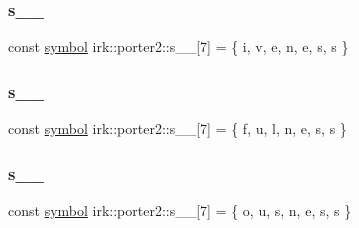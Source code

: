 \mbox{\label{namespaceirk_1_1porter2_a31f6186ad33070b805879b55bb461640}} 
\subsubsection{\texorpdfstring{s\+\_\+\_}{s\_5\_21}}
{\footnotesize\ttfamily const \mbox{\hyperlink{namespaceirk_1_1porter2_afd04c4eb58a1dabcf8f3ab2d7e9f9ed5}{symbol}} irk\+::porter2\+::s\+\_\+\_\mbox{[}7\mbox{]} = \{ \textquotesingle{}i\textquotesingle{}, \textquotesingle{}v\textquotesingle{}, \textquotesingle{}e\textquotesingle{}, \textquotesingle{}n\textquotesingle{}, \textquotesingle{}e\textquotesingle{}, \textquotesingle{}s\textquotesingle{}, \textquotesingle{}s\textquotesingle{} \}\hspace{0.3cm}{\ttfamily [static]}}

\mbox{\label{namespaceirk_1_1porter2_ad6c9dfb1faea8118a0c3d66be049c746}} 
\subsubsection{\texorpdfstring{s\+\_\+\_}{s\_5\_22}}
{\footnotesize\ttfamily const \mbox{\hyperlink{namespaceirk_1_1porter2_afd04c4eb58a1dabcf8f3ab2d7e9f9ed5}{symbol}} irk\+::porter2\+::s\+\_\+\_\mbox{[}7\mbox{]} = \{ \textquotesingle{}f\textquotesingle{}, \textquotesingle{}u\textquotesingle{}, \textquotesingle{}l\textquotesingle{}, \textquotesingle{}n\textquotesingle{}, \textquotesingle{}e\textquotesingle{}, \textquotesingle{}s\textquotesingle{}, \textquotesingle{}s\textquotesingle{} \}\hspace{0.3cm}{\ttfamily [static]}}

\mbox{\label{namespaceirk_1_1porter2_a215898b353d54f071b29c9f8c2747cf4}} 
\subsubsection{\texorpdfstring{s\+\_\+\_}{s\_5\_23}}
{\footnotesize\ttfamily const \mbox{\hyperlink{namespaceirk_1_1porter2_afd04c4eb58a1dabcf8f3ab2d7e9f9ed5}{symbol}} irk\+::porter2\+::s\+\_\+\_\mbox{[}7\mbox{]} = \{ \textquotesingle{}o\textquotesingle{}, \textquotesingle{}u\textquotesingle{}, \textquotesingle{}s\textquotesingle{}, \textquotesingle{}n\textquotesingle{}, \textquotesingle{}e\textquotesingle{}, \textquotesingle{}s\textquotesingle{}, \textquotesingle{}s\textquotesingle{} \}\hspace{0.3cm}{\ttfamily [static]}}

